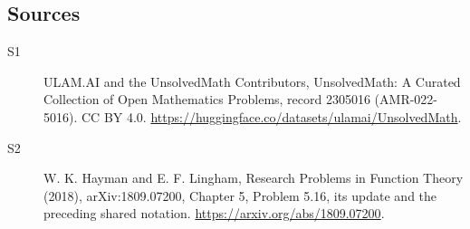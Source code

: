 \documentclass[11pt]{article}
\begin{document}
\subsection{Sources}
\begin{description}
\item[\hypertarget{source:2305016:1}{S1}] ULAM.AI and the UnsolvedMath Contributors, UnsolvedMath: A Curated Collection of Open Mathematics Problems, record 2305016 (AMR-022-5016). CC BY 4.0. \url{https://huggingface.co/datasets/ulamai/UnsolvedMath}.
\item[\hypertarget{source:2305016:2}{S2}] W. K. Hayman and E. F. Lingham, Research Problems in Function Theory (2018), arXiv:1809.07200, Chapter 5, Problem 5.16, its update and the preceding shared notation. \url{https://arxiv.org/abs/1809.07200}.
\end{description}
\label{end:2305016}
\end{document}
